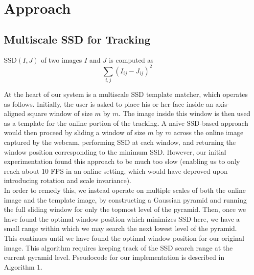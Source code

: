 \documentclass[10pt,twocolumn,letterpaper]{article}
\begin{document}
\section*{Approach}

\subsection*{Multiscale SSD for Tracking}
SSD$(I, J)$ of two images $I$ and $J$ is computed as
$$\displaystyle\sum_{i, j}(I_{ij} - J_{ij})^{2}$$

At the heart of our system is a multiscale SSD template matcher, which operates as follows.
Initially, the user is asked to place his or her face inside an axis-aligned square window of size
$m$ by $m$. The image inside this window is then used as a template for the online
portion of the tracking. A naive SSD-based approach would then proceed by sliding a window of
size $m$ by $m$ across the online image captured by the webcam, performing SSD at each window,
and returning the window position corresponding to the minimum SSD. However, our initial
experimentation found this approach to be much too slow (enabling us to only reach about 10 FPS
in an online setting, which would have deproved upon introducing rotation and scale invariance).\\

In order to remedy this, we instead operate on multiple scales of both the online image and the
template image, by constructing a Gaussian pyramid \cite{gpyr} and running the full sliding window for only
the topmost level of the pyramid. Then, once we have found the optimal window position which
minimizes SSD here, we have a small range within which we may search the next lowest level of
the pyramid. This continues until we have found the optimal window position for our original image.
This algorithm requires keeping track of the SSD search range at the current pyramid level.
Pseudocode for our implementation is described in Algorithm 1.\\
\end{document}
